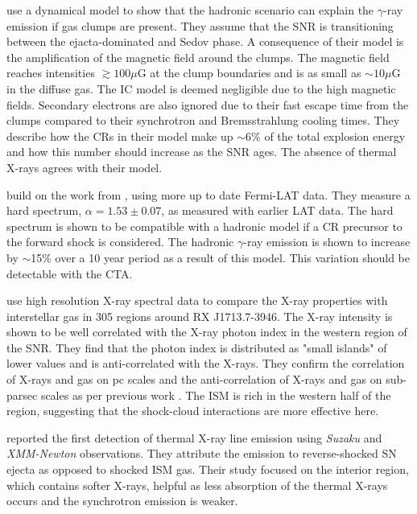 \documentclass[12pt,a4paper]{article}
\begin{document}
\cite{2014MNRAS.445L..70G} use a dynamical model to show that the hadronic scenario can explain the $\gamma$-ray emission if gas clumps are present. They assume that the SNR is transitioning between the ejacta-dominated and Sedov phase. A consequence of their model is the amplification of the magnetic field around the clumps. The magnetic field reaches intensities $\gtrsim 100 \mu$G at the clump boundaries and is as small as $\sim 10 \mu$G in the diffuse gas. The IC model is deemed negligible due to the high magnetic fields. Secondary electrons are also ignored due to their fast escape time from the clumps compared to their synchrotron and Bremsstrahlung cooling times. They describe how the CRs in their model make up $\sim$6\% of the total explosion energy and how this number should increase as the SNR ages. The absence of thermal X-rays agrees with their model. 

\cite{2015A&A...577A..12F} build on the work from \cite{2011ApJ...734...28A}, using more up to date Fermi-LAT data. They measure a hard spectrum, $\alpha = 1.53 \pm 0.07$, as measured with earlier LAT data. The hard spectrum is shown to be compatible with a hadronic model if a CR precursor to the forward shock is considered. The hadronic $\gamma$-ray emission is shown to increase by $\sim$15\% over a 10 year period as a result of this model. This variation should be detectable with the CTA. 

\cite{2015ApJ...799..175S} use high resolution X-ray spectral data to compare the X-ray properties with interstellar gas in 305 regions around RX J1713.7-3946. The X-ray intensity is shown to be well correlated with the X-ray photon index in the western region of the SNR. They find that the photon index is distributed as "small islands" of lower values and is anti-correlated with the X-rays. They confirm the correlation of X-rays and gas on pc scales and the anti-correlation of X-rays and gas on sub-parsec scales as per previous work \citep{2010ApJ...724...59S, 2013ApJ...778...59S}. The ISM is rich in the western half of the region, suggesting that the shock-cloud interactions are more effective here. 


\cite{2015ApJ...814...29K} reported the first detection of thermal X-ray line emission using \textit{Suzaku} and \textit{XMM-Newton} observations. They attribute the emission to reverse-shocked SN ejecta as opposed to shocked ISM gas. Their study focused on the interior region, which contains softer X-rays, helpful as less absorption of the thermal X-rays occurs and the synchrotron emission is weaker. 
\end{document}
